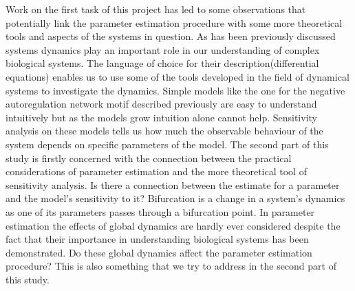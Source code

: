 \documentclass[12pt,a4paper,titlepage]{article}
\begin{document}
Work on the first task of this project has led to some observations that potentially link the parameter estimation procedure with some more theoretical tools and aspects of the systems in question.  
As has been previously discussed systems dynamics play an important role in our understanding of complex biological systems. The language of choice for their description(differential equations) enables us to use some of the tools developed in the field of dynamical systems to investigate the dynamics. Simple models like the one for the negative autoregulation network motif described previously are easy to understand intuitively but as the models grow intuition alone cannot help. Sensitivity analysis on these models tells us how much the observable behaviour of the system depends on specific parameters of the model. The second part of this study is firstly concerned with the connection between the practical considerations of parameter estimation and the more theoretical tool of sensitivity analysis. Is there a connection between the estimate for a parameter and the model's sensitivity to it? Bifurcation is a change in a system's dynamics as one of its parameters passes through a bifurcation point. In parameter estimation the effects of global dynamics are hardly ever considered despite the fact that their importance in understanding biological systems has been demonstrated\cite{}. Do these global dynamics affect the parameter estimation procedure? This is also something that we try to address in the second part of this study.
\end{document}
